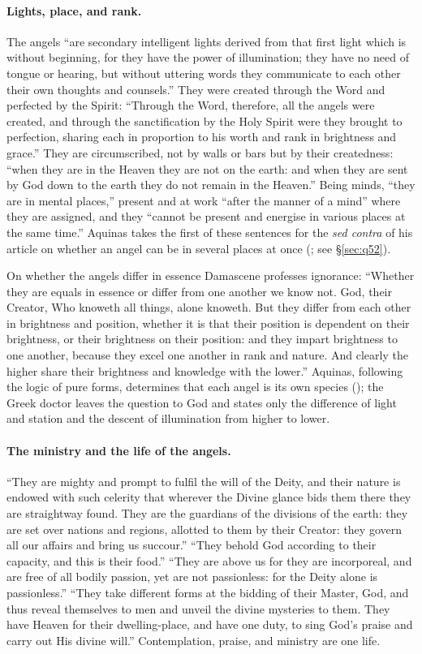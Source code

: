\paragraph{Lights, place, and rank.} The angels ``are secondary intelligent
lights derived from that first light which is without beginning, for they
have the power of illumination; they have no need of tongue or hearing, but
without uttering words they communicate to each other their own thoughts and
counsels.'' They were created through the Word and perfected by the Spirit:
``Through the Word, therefore, all the angels were created, and through the
sanctification by the Holy Spirit were they brought to perfection, sharing
each in proportion to his worth and rank in brightness and grace.'' They are
circumscribed, not by walls or bars but by their createdness: ``when they
are in the Heaven they are not on the earth: and when they are sent by God
down to the earth they do not remain in the Heaven.'' Being minds, ``they
are in mental places,'' present and at work ``after the manner of a mind''
where they are assigned, and they ``cannot be present and energise in
various places at the same time.'' Aquinas takes the first of these
sentences for the \emph{sed contra} of his article on whether an angel can
be in several places at once (; see \S\ref{sec:q52}).

On whether the angels differ in essence Damascene professes ignorance:
``Whether they are equals in essence or differ from one another we know
not. God, their Creator, Who knoweth all things, alone knoweth. But they
differ from each other in brightness and position, whether it is that their
position is dependent on their brightness, or their brightness on their
position: and they impart brightness to one another, because they excel one
another in rank and nature. And clearly the higher share their brightness
and knowledge with the lower.'' Aquinas, following the logic of pure forms,
determines that each angel is its own species (); the Greek
doctor leaves the question to God and states only the difference of light
and station and the descent of illumination from higher to lower.

\paragraph{The ministry and the life of the angels.} ``They are mighty and
prompt to fulfil the will of the Deity, and their nature is endowed with
such celerity that wherever the Divine glance bids them there they are
straightway found. They are the guardians of the divisions of the earth:
they are set over nations and regions, allotted to them by their Creator:
they govern all our affairs and bring us succour.'' ``They behold God
according to their capacity, and this is their food.'' ``They are above us
for they are incorporeal, and are free of all bodily passion, yet are not
passionless: for the Deity alone is passionless.'' ``They take different
forms at the bidding of their Master, God, and thus reveal themselves to men
and unveil the divine mysteries to them. They have Heaven for their
dwelling-place, and have one duty, to sing God's praise and carry out His
divine will.'' Contemplation, praise, and ministry are one life.

